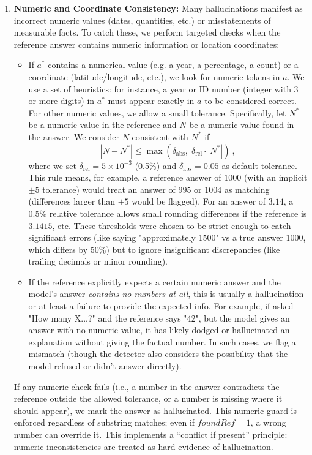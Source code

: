 \documentclass{article}
\begin{document}
\begin{enumerate}
    \item \textbf{Numeric and Coordinate Consistency:} Many hallucinations manifest as incorrect numeric values (dates, quantities, etc.) or misstatements of measurable facts. To catch these, we perform targeted checks when the reference answer contains numeric information or location coordinates:
    \begin{itemize}
        \item If $a^*$ contains a numerical value (e.g. a year, a percentage, a count) or a coordinate (latitude/longitude, etc.), we look for numeric tokens in $a$. We use a set of heuristics: for instance, a year or ID number (integer with 3 or more digits) in $a^*$ must appear exactly in $a$ to be considered correct. For other numeric values, we allow a small tolerance. Specifically, let $N^*$ be a numeric value in the reference and $N$ be a numeric value found in the answer. We consider $N$ consistent with $N^*$ if 
        \[
        |N - N^*| \le \max(\delta_{\text{abs}}, \;\delta_{\text{rel}} \cdot |N^*|)~,
        \] 
        where we set $\delta_{\text{rel}} = 5\times 10^{-3}$ (0.5\%) and $\delta_{\text{abs}} = 0.05$ as default tolerance. 
        This rule means, for example, a reference answer of $1000$ (with an implicit $\pm5$ tolerance) would treat an answer of $995$ or $1004$ as matching (differences larger than $\pm 5$ would be flagged). For an answer of $3.14$, a 0.5\% relative tolerance allows small rounding differences if the reference is $3.1415$, etc. These thresholds were chosen to be strict enough to catch significant errors (like saying "approximately 1500" vs a true answer 1000, which differs by 50\%) but to ignore insignificant discrepancies (like trailing decimals or minor rounding).
        \item If the reference explicitly expects a certain numeric answer and the model’s answer \emph{contains no numbers at all}, this is usually a hallucination or at least a failure to provide the expected info. For example, if asked "How many X...?" and the reference says "42", but the model gives an answer with no numeric value, it has likely dodged or hallucinated an explanation without giving the factual number. In such cases, we flag a mismatch (though the detector also considers the possibility that the model refused or didn't answer directly).
    \end{itemize}
    If any numeric check fails (i.e., a number in the answer contradicts the reference outside the allowed tolerance, or a number is missing where it should appear), we mark the answer as hallucinated. This numeric guard is enforced regardless of substring matches; even if $\mathit{foundRef}=1$, a wrong number can override it. This implements a “conflict if present” principle: numeric inconsistencies are treated as hard evidence of hallucination.


\end{enumerate}
\end{document}
